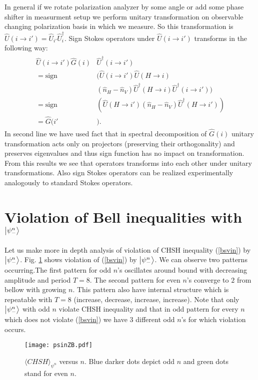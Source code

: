 \documentclass[aps,pra, twocolumn, showpacs]{revtex4-2}
\begin{document}
\begin{appendices}
In general if we rotate polarization analyzer by some angle  or add some phase shifter in measurment setup we perform unitary transformation on observable changing polarization basis in which we measure. So this transformation is $\hat U(i\rightarrow i')=\hat U_{i'}\hat U_i^\dagger$. Sign Stokes operators under $\hat U(i\rightarrow i')$ transforms in the following way:
\begin{align}
\begin{split}
\hat U(i\rightarrow i')\hat G(i)&\hat U^\dagger(i\rightarrow i')\\
=\mathrm{sign}&(\hat U(i\rightarrow i')\hat U(H\rightarrow i)\\
&(\hat n_H-\hat n_{V})\hat U^\dagger(H\rightarrow i)\hat U^\dagger(i\rightarrow i'))\\
=\mathrm{sign}&(\hat U(H\rightarrow i')(\hat n_H-\hat n_{V})\hat U^\dagger(H\rightarrow i'))\\
=\hat G(i'&).
\end{split}
\end{align} 
In second line we have used fact that in spectral decomposition of $\hat G(i)$ unitary transformation acts only on projectors (preserving their orthogonality) and preserves eigenvalues and thus sign function has no impact on transformation. From this results we see that operators transforms into each other under unitary transformations. Also sign Stokes operators can be realized experimentally analogously to standard Stokes operators. 



\section{Violation of Bell inequalities with $\ket{\psi^n_-}$ }\label{psinV}

Let us make more in depth analysis of violation of CHSH inequality (\ref{bsvin}) by $\ket{\psi^n_-}$. Fig. \ref{psinZB} shows violation of (\ref{bsvin}) by $\ket{\psi^n_-}$. We can observe two patterns occurring.The first pattern for odd $n$'s oscillates around bound with decreasing amplitude and period $T=8$. The second pattern for even $n$'s converge to $2$ from bellow with growing $n$. This pattern also have internal structure which is repeatable with $T=8$ (increase, decrease, increase, increase). Note that only $\ket{\psi^n_-}$ with odd $n$ violate CHSH inequality and that in odd pattern for every $n$ which does not violate (\ref{bsvin}) we have $3$ different odd $n$'s for which violation occurs.
\begin{figure}[h!]
\centering
\texttt{[image: psinZB.pdf]} 
\caption{$\langle CHSH\rangle_{\psi^n}$ versus $n$. Blue darker dots depict odd $n$ and green dots stand for even $n$.}
\label{psinZB}
\end{figure}


\end{appendices}
\end{document}

